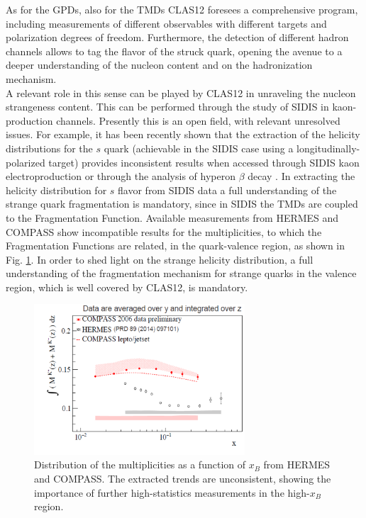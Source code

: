 %
%
As for the GPDs, also for the TMDs CLAS12 foresees a comprehensive  program, including measurements of different observables with different targets and polarization degrees of freedom. 
Furthermore, the detection of different hadron channels allows to tag the flavor of the struck quark, opening the avenue to a deeper understanding of the nucleon content and on the hadronization mechanism.\\
A relevant role in this sense can be played by CLAS12 in unraveling the nucleon strangeness content. This can be performed through the study of SIDIS in kaon-production channels. Presently this is an open field, with relevant unresolved issues. For example, it has been recently shown that the extraction of the helicity distributions for the $s$ quark (achievable in the SIDIS case using a longitudinally-polarized target) provides inconsistent results when accessed through SIDIS kaon electroproduction or through the analysis of hyperon $\beta$ decay \cite{seder_dis2016}.
In extracting the helicity distribution for $s$ flavor from SIDIS data a full understanding of the strange quark fragmentation is mandatory, since in SIDIS the TMDs are coupled to the Fragmentation Function. Available measurements from HERMES and COMPASS show incompatible results for the multiplicities, to which the Fragmentation Functions are related, in the quark-valence region, as shown in Fig. \ref{fig::delta_s}. In order to shed light on the strange helicity distribution, a full understanding of the fragmentation mechanism for strange quarks in the valence region, which is well covered by CLAS12, is mandatory. 
%
\begin{figure}
\centering
\includegraphics[width=0.7\textwidth]{sidis/delta_s_comparison.png}
\caption{\label{fig::delta_s} Distribution of the multiplicities as a function of $x_B$ from HERMES and COMPASS. The extracted trends are unconsistent, showing the importance of further high-statistics measurements in the high-$x_B$ region.}
\end{figure}

